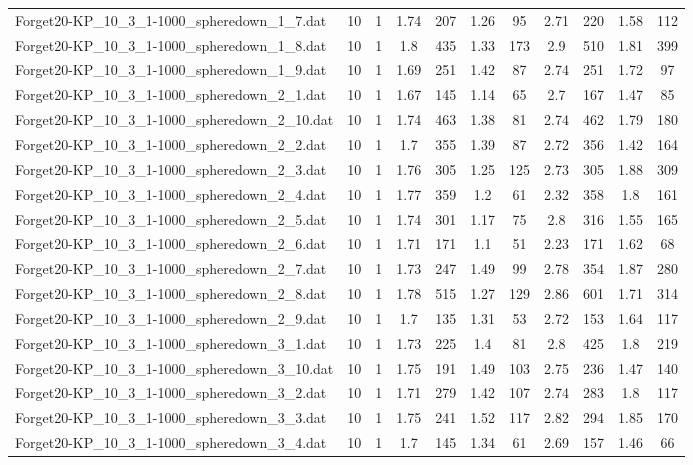 \begin{table}[!ht]
\begin{tabular}{lcccccccccc}
Forget20-KP\_10\_3\_1-1000\_spheredown\_1\_7.dat & 10 & 1 & 1.74 & 207 & 1.26 & 95 & 2.71 & 220 & 1.58 & 112 \\
Forget20-KP\_10\_3\_1-1000\_spheredown\_1\_8.dat & 10 & 1 & 1.8 & 435 & 1.33 & 173 & 2.9 & 510 & 1.81 & 399 \\
Forget20-KP\_10\_3\_1-1000\_spheredown\_1\_9.dat & 10 & 1 & 1.69 & 251 & 1.42 & 87 & 2.74 & 251 & 1.72 & 97 \\
Forget20-KP\_10\_3\_1-1000\_spheredown\_2\_1.dat & 10 & 1 & 1.67 & 145 & 1.14 & 65 & 2.7 & 167 & 1.47 & 85 \\
Forget20-KP\_10\_3\_1-1000\_spheredown\_2\_10.dat & 10 & 1 & 1.74 & 463 & 1.38 & 81 & 2.74 & 462 & 1.79 & 180 \\
Forget20-KP\_10\_3\_1-1000\_spheredown\_2\_2.dat & 10 & 1 & 1.7 & 355 & 1.39 & 87 & 2.72 & 356 & 1.42 & 164 \\
Forget20-KP\_10\_3\_1-1000\_spheredown\_2\_3.dat & 10 & 1 & 1.76 & 305 & 1.25 & 125 & 2.73 & 305 & 1.88 & 309 \\
Forget20-KP\_10\_3\_1-1000\_spheredown\_2\_4.dat & 10 & 1 & 1.77 & 359 & 1.2 & 61 & 2.32 & 358 & 1.8 & 161 \\
Forget20-KP\_10\_3\_1-1000\_spheredown\_2\_5.dat & 10 & 1 & 1.74 & 301 & 1.17 & 75 & 2.8 & 316 & 1.55 & 165 \\
Forget20-KP\_10\_3\_1-1000\_spheredown\_2\_6.dat & 10 & 1 & 1.71 & 171 & 1.1 & 51 & 2.23 & 171 & 1.62 & 68 \\
Forget20-KP\_10\_3\_1-1000\_spheredown\_2\_7.dat & 10 & 1 & 1.73 & 247 & 1.49 & 99 & 2.78 & 354 & 1.87 & 280 \\
Forget20-KP\_10\_3\_1-1000\_spheredown\_2\_8.dat & 10 & 1 & 1.78 & 515 & 1.27 & 129 & 2.86 & 601 & 1.71 & 314 \\
Forget20-KP\_10\_3\_1-1000\_spheredown\_2\_9.dat & 10 & 1 & 1.7 & 135 & 1.31 & 53 & 2.72 & 153 & 1.64 & 117 \\
Forget20-KP\_10\_3\_1-1000\_spheredown\_3\_1.dat & 10 & 1 & 1.73 & 225 & 1.4 & 81 & 2.8 & 425 & 1.8 & 219 \\
Forget20-KP\_10\_3\_1-1000\_spheredown\_3\_10.dat & 10 & 1 & 1.75 & 191 & 1.49 & 103 & 2.75 & 236 & 1.47 & 140 \\
Forget20-KP\_10\_3\_1-1000\_spheredown\_3\_2.dat & 10 & 1 & 1.71 & 279 & 1.42 & 107 & 2.74 & 283 & 1.8 & 117 \\
Forget20-KP\_10\_3\_1-1000\_spheredown\_3\_3.dat & 10 & 1 & 1.75 & 241 & 1.52 & 117 & 2.82 & 294 & 1.85 & 170 \\
Forget20-KP\_10\_3\_1-1000\_spheredown\_3\_4.dat & 10 & 1 & 1.7 & 145 & 1.34 & 61 & 2.69 & 157 & 1.46 & 66 \\

\end{tabular}
\end{table}
